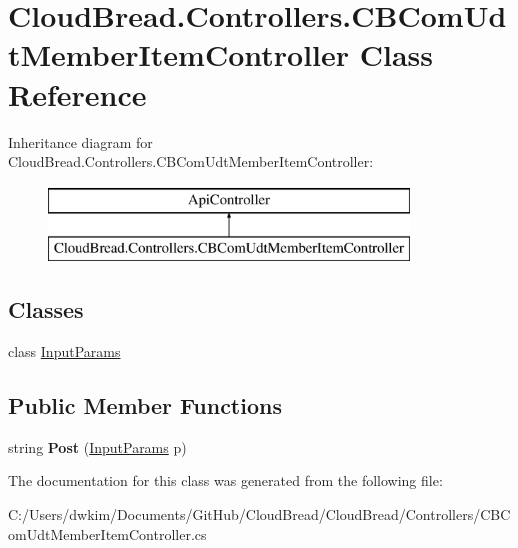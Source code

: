 \hypertarget{a00039}{}\section{Cloud\+Bread.\+Controllers.\+C\+B\+Com\+Udt\+Member\+Item\+Controller Class Reference}
\label{a00039}
Inheritance diagram for Cloud\+Bread.\+Controllers.\+C\+B\+Com\+Udt\+Member\+Item\+Controller\+:\begin{figure}[H]
\begin{center}
\leavevmode
\includegraphics[height=2.000000cm]{a00039}
\end{center}
\end{figure}
\subsection*{Classes}
\begin{DoxyCompactItemize}
\item 
class \hyperlink{a00109}{Input\+Params}
\end{DoxyCompactItemize}
\subsection*{Public Member Functions}
\begin{DoxyCompactItemize}
\item 
string {\bfseries Post} (\hyperlink{a00109}{Input\+Params} p)\hypertarget{a00039_a5696e47c8f195bbcaa64a1a89540af94}{}\label{a00039_a5696e47c8f195bbcaa64a1a89540af94}

\end{DoxyCompactItemize}


The documentation for this class was generated from the following file\+:\begin{DoxyCompactItemize}
\item 
C\+:/\+Users/dwkim/\+Documents/\+Git\+Hub/\+Cloud\+Bread/\+Cloud\+Bread/\+Controllers/C\+B\+Com\+Udt\+Member\+Item\+Controller.\+cs\end{DoxyCompactItemize}
